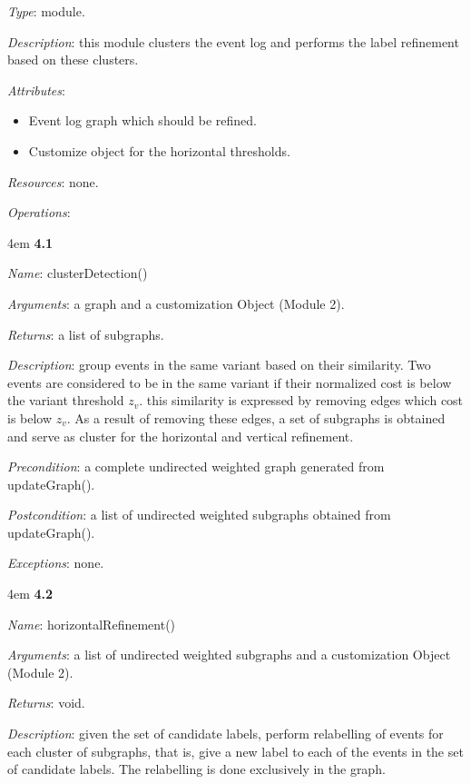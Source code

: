 \documentclass[notitlepage]{article}
\begin{document}
\begin{flushleft}
\textit{Type}: module.

\textit{Description}: this module clusters the event log and performs the label refinement based on these clusters.

\textit{Attributes}: \begin{itemize}
	\item Event log graph which should be refined.
	\item Customize object for the horizontal thresholds.
\end{itemize}

\textit{Resources}: none.

\textit{Operations}: 
\medskip

\par
\begingroup
\leftskip4em
\textbf{4.1} 

\textit{Name}: clusterDetection()

\textit{Arguments}: a graph and a customization Object (Module 2).

\textit{Returns}: a list of subgraphs.

\textit{Description}: group events in the same variant based on their similarity. Two events are considered to be in the same variant if their normalized cost is below the variant threshold $z_v$. this similarity is expressed by removing edges which cost is below $z_v$. As a result of removing these edges, a set of subgraphs is obtained and serve as cluster for the horizontal and vertical refinement. 

\textit{Precondition}: a complete undirected weighted graph generated from updateGraph().

\textit{Postcondition}: a list of undirected weighted subgraphs obtained from updateGraph().

\textit{Exceptions}: none.
\par
\endgroup

\medskip

\par
\begingroup
\leftskip4em
\textbf{4.2} 

\textit{Name}: horizontalRefinement()

\textit{Arguments}: a list of undirected weighted subgraphs and a customization Object (Module 2).

\textit{Returns}: void.

\textit{Description}: given the set of candidate labels, perform relabelling of events for each cluster of subgraphs, that is, give a new label to each of the events in the set of candidate labels. The relabelling is done exclusively in the graph.


\end{flushleft}
\end{document}
